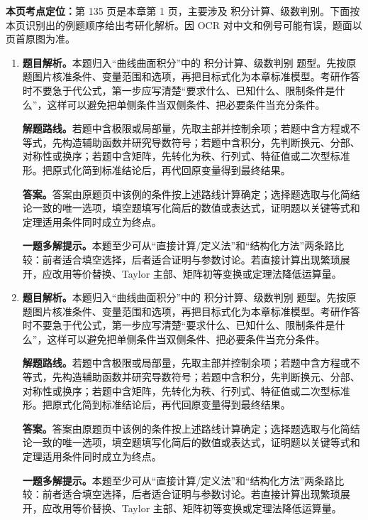 \begin{solutionblock}
\textbf{本页考点定位：}第 135 页是本章第 1 页，主要涉及 积分计算、级数判别。下面按本页识别出的例题顺序给出考研化解析。因 OCR 对中文和例号可能有误，题面以页首原图为准。

\begin{enumerate}[label=\textbf{例\arabic*.}, leftmargin=2.4em]

\item \textbf{题目解析。}本题归入“曲线曲面积分”中的 积分计算、级数判别 题型。先按原题图片核准条件、变量范围和选项，再把目标式化为本章标准模型。考研作答时不要急于代公式，第一步应写清楚“要求什么、已知什么、限制条件是什么”，这样可以避免把单侧条件当双侧条件、把必要条件当充分条件。

\textbf{解题路线。}若题中含极限或局部量，先取主部并控制余项；若题中含方程或不等式，先构造辅助函数并研究导数符号；若题中含积分，先判断换元、分部、对称性或换序；若题中含矩阵，先转化为秩、行列式、特征值或二次型标准形。把原式化简到标准结论后，再代回原变量得到最终结果。

\textbf{答案。}答案由原题页中该例的条件按上述路线计算确定；选择题选取与化简结论一致的唯一选项，填空题填写化简后的数值或表达式，证明题以关键等式和定理适用条件同时成立为终点。

\textbf{一题多解提示。}本题至少可从“直接计算/定义法”和“结构化方法”两条路比较：前者适合填空选择，后者适合证明与参数讨论。若直接计算出现繁琐展开，应改用等价替换、Taylor 主部、矩阵初等变换或定理法降低运算量。

\item \textbf{题目解析。}本题归入“曲线曲面积分”中的 积分计算、级数判别 题型。先按原题图片核准条件、变量范围和选项，再把目标式化为本章标准模型。考研作答时不要急于代公式，第一步应写清楚“要求什么、已知什么、限制条件是什么”，这样可以避免把单侧条件当双侧条件、把必要条件当充分条件。

\textbf{解题路线。}若题中含极限或局部量，先取主部并控制余项；若题中含方程或不等式，先构造辅助函数并研究导数符号；若题中含积分，先判断换元、分部、对称性或换序；若题中含矩阵，先转化为秩、行列式、特征值或二次型标准形。把原式化简到标准结论后，再代回原变量得到最终结果。

\textbf{答案。}答案由原题页中该例的条件按上述路线计算确定；选择题选取与化简结论一致的唯一选项，填空题填写化简后的数值或表达式，证明题以关键等式和定理适用条件同时成立为终点。

\textbf{一题多解提示。}本题至少可从“直接计算/定义法”和“结构化方法”两条路比较：前者适合填空选择，后者适合证明与参数讨论。若直接计算出现繁琐展开，应改用等价替换、Taylor 主部、矩阵初等变换或定理法降低运算量。

\end{enumerate}
\end{solutionblock}



